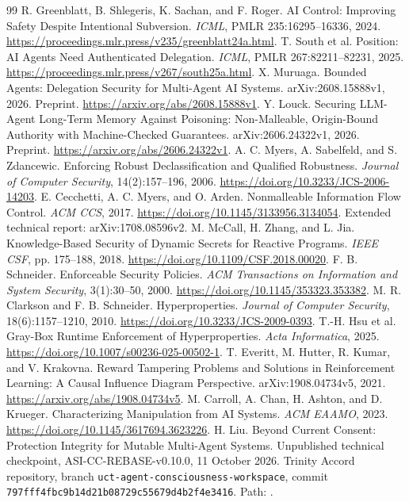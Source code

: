\begin{thebibliography}{99}\small\setlength{\itemsep}{2pt}\setlength{\parskip}{0pt}
 R. Greenblatt, B. Shlegeris, K. Sachan, and F. Roger. AI Control: Improving Safety Despite Intentional Subversion. \emph{ICML}, PMLR 235:16295--16336, 2024. \url{https://proceedings.mlr.press/v235/greenblatt24a.html}.
 T. South et al. Position: AI Agents Need Authenticated Delegation. \emph{ICML}, PMLR 267:82211--82231, 2025. \url{https://proceedings.mlr.press/v267/south25a.html}.
 X. Muruaga. Bounded Agents: Delegation Security for Multi-Agent AI Systems. arXiv:2608.15888v1, 2026. Preprint. \url{https://arxiv.org/abs/2608.15888v1}.
 Y. Louck. Securing LLM-Agent Long-Term Memory Against Poisoning: Non-Malleable, Origin-Bound Authority with Machine-Checked Guarantees. arXiv:2606.24322v1, 2026. Preprint. \url{https://arxiv.org/abs/2606.24322v1}.
 A. C. Myers, A. Sabelfeld, and S. Zdancewic. Enforcing Robust Declassification and Qualified Robustness. \emph{Journal of Computer Security}, 14(2):157--196, 2006. \url{https://doi.org/10.3233/JCS-2006-14203}.
 E. Cecchetti, A. C. Myers, and O. Arden. Nonmalleable Information Flow Control. \emph{ACM CCS}, 2017. \url{https://doi.org/10.1145/3133956.3134054}. Extended technical report: arXiv:1708.08596v2.
 M. McCall, H. Zhang, and L. Jia. Knowledge-Based Security of Dynamic Secrets for Reactive Programs. \emph{IEEE CSF}, pp. 175--188, 2018. \url{https://doi.org/10.1109/CSF.2018.00020}.
 F. B. Schneider. Enforceable Security Policies. \emph{ACM Transactions on Information and System Security}, 3(1):30--50, 2000. \url{https://doi.org/10.1145/353323.353382}.
 M. R. Clarkson and F. B. Schneider. Hyperproperties. \emph{Journal of Computer Security}, 18(6):1157--1210, 2010. \url{https://doi.org/10.3233/JCS-2009-0393}.
 T.-H. Hsu et al. Gray-Box Runtime Enforcement of Hyperproperties. \emph{Acta Informatica}, 2025. \url{https://doi.org/10.1007/s00236-025-00502-1}.
 T. Everitt, M. Hutter, R. Kumar, and V. Krakovna. Reward Tampering Problems and Solutions in Reinforcement Learning: A Causal Influence Diagram Perspective. arXiv:1908.04734v5, 2021. \url{https://arxiv.org/abs/1908.04734v5}.
 M. Carroll, A. Chan, H. Ashton, and D. Krueger. Characterizing Manipulation from AI Systems. \emph{ACM EAAMO}, 2023. \url{https://doi.org/10.1145/3617694.3623226}.
 H. Liu. Beyond Current Consent: Protection Integrity for Mutable Multi-Agent Systems. Unpublished technical checkpoint, ASI-CC-REBASE-v0.10.0, 11 October 2026. Trinity Accord repository, branch \texttt{uct-agent-consciousness-workspace}, commit \texttt{797fff4fbc9b14d21b08729c55679d4b2f4e3416}. Path: .

\end{thebibliography}

